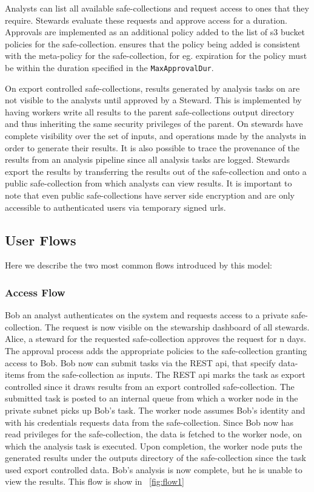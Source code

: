 Analysts can list all available safe-collections and request access to ones that they require.
Stewards evaluate these requests and approve access for a duration. Approvals are implemented as an additional
policy added to the list of s3 bucket policies for the safe-collection. \NAME ensures that the policy
being added is consistent with the meta-policy for the safe-collection, for eg. expiration for the policy
must be within the duration specified in the \texttt{MaxApprovalDur}.

On export controlled safe-collections, results generated by analysis tasks on \NAME are not visible to the
analysts until approved by a Steward. This is implemented by having workers write all results to the
parent safe-collections output directory and thus inheriting the same security privileges of the parent.
On \NAME stewards have complete visibility over the set of inputs, and operations made by the analysts
in order to generate their results. It is also possible to trace the provenance of the results from an
analysis pipeline since all analysis tasks are logged.
Stewards export the results by transferring the results out of the safe-collection and onto a public
safe-collection from which analysts can view results. It is important to note that even public
safe-collections have server side encryption and are only accessible to authenticated users via temporary
signed urls.


\subsection{User Flows}

Here we describe the two most common flows introduced by this model:

\subsubsection{Access Flow}

Bob an analyst authenticates on the system and requests access to a private safe-collection.
The request is now visible on the stewarship dashboard of all stewards. Alice, a steward for the requested
safe-collection approves the request for n days. The approval process adds the appropriate policies to the
safe-collection granting access to Bob. Bob now can submit tasks via the  REST api, that specify data-items
from the safe-collection as inputs. The REST api marks the task as export controlled since it draws results
from an export controlled safe-collection. The submitted task is posted to an internal queue from which a
worker node in the \NAME private subnet picks up Bob's task. The worker node assumes Bob's identity and with
his credentials requests data from the safe-collection. Since Bob now has read privileges for the
safe-collection, the data is fetched to the worker node, on which the analysis task is executed.
Upon completion, the worker node puts the generated results under the outputs directory of the safe-collection
since the task used export controlled data. Bob's analysis is now complete, but he is unable to view the
results. This flow is show in \figurename~\ref{fig:flow1}

